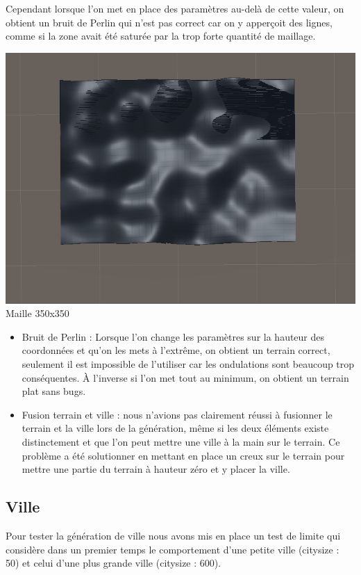 	Cependant lorsque l'on met en place des paramètres au-delà de cette valeur, on obtient un bruit de Perlin qui n'est pas correct car on y apperçoit des lignes, comme si la zone avait été saturée par la trop forte quantité de maillage.
	
\begin{center}
	\centering
    \includegraphics[height = 5 cm]{images/maille(350x350).png}\\
	 \small{Maille 350x350}
\end{center}

\begin{itemize}
	\item Bruit de Perlin : Lorsque l'on change les paramètres sur la hauteur des coordonnées et qu'on les mets à l'extrême, on obtient un terrain correct, seulement il est impossible de l'utiliser car les ondulations sont beaucoup trop conséquentes. À l'inverse si l'on met tout au minimum, on obtient un terrain plat sans bugs.
	
	\item Fusion terrain et ville : nous n'avions pas clairement réussi à fusionner le terrain et la ville lors de la génération, même si les deux éléments existe distinctement et que l'on peut mettre une ville à la main sur le terrain. Ce problème a été solutionner en mettant en place un creux sur le terrain pour mettre une partie du terrain à hauteur zéro et y placer la ville.
\end{itemize}

\subsection{Ville}

Pour tester la génération de ville nous avons mis en place un test de limite qui considère dans un premier temps le comportement d'une petite ville (citysize : 50) et celui d'une plus grande ville (citysize : 600).


